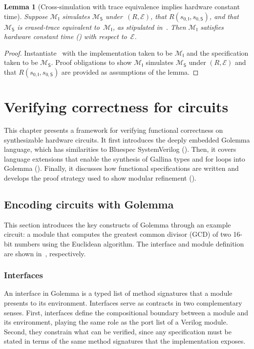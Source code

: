 \documentclass[fontset=fira-newtxsf]{mitthesis}
\theoremstyle{definition}
\theoremstyle{plain}
\newtheorem{lemma}{Lemma}[section]
\begin{document}
\begin{lemma}[Cross-simulation with trace equivalence implies hardware constant time]
\label{lem:cross-sim-hct}
Suppose \(\mathcal{M}_{\mathsf I}\) simulates \(\mathcal{M}_{\mathsf S}\) under~\((R,\mathcal E)\), that \(R(s_{0,\mathsf I},s_{0,\mathsf S})\), and that~\(\mathcal{M}_{\mathsf S}\) is erased-trace equivalent to~\(\mathcal{M}_{\mathsf I}\), as stipulated in~.
Then \(\mathcal{M}_{\mathsf I}\) satisfies hardware constant time () with respect to~\(\mathcal E\).
\end{lemma}

\begin{proof}[Proof]
Instantiate~ with the implementation taken to be $\mathcal{M}_{\mathsf I}$ and the specification taken to be $\mathcal{M}_{\mathsf S}$. Proof obligations to show $\mathcal{M}_{\mathsf I}$ simulates $\mathcal{M}_{\mathsf S}$ under $(R, \mathcal{E})$ and that $R(s_{0,\mathsf I}, s_{0,\mathsf S})$ are provided as assumptions of the lemma.
\end{proof}

\chapter{Verifying correctness for circuits} \label{chap:Golemma}

This chapter presents a framework for verifying functional correctness on synthesizable hardware circuits. It first introduces the deeply embedded Golemma language, which has similarities to Bluespec SystemVerilog ().
Then, it covers language extensions that enable the synthesis of Gallina types and for loops into Golemma ().
Finally, it discusses how functional specifications are written and develops the proof strategy used to show modular refinement ().

\section{Encoding circuits with Golemma} \label{sec:Golemma-intro}
This section introduces the key constructs of Golemma through an example circuit: a module that computes the greatest common divisor (GCD) of two 16-bit numbers using the Euclidean algorithm.
The interface and module definition are shown in~, respectively.

\subsection{Interfaces}
An interface in Golemma is a typed list of method signatures that a module presents to its environment.
Interfaces serve as contracts in two complementary senses.
First, interfaces define the compositional boundary between a module and its environment, playing the same role as the port list of a Verilog module.
Second, they constrain what can be verified, since any specification must be stated in terms of the same method signatures that the implementation exposes.
\end{document}
